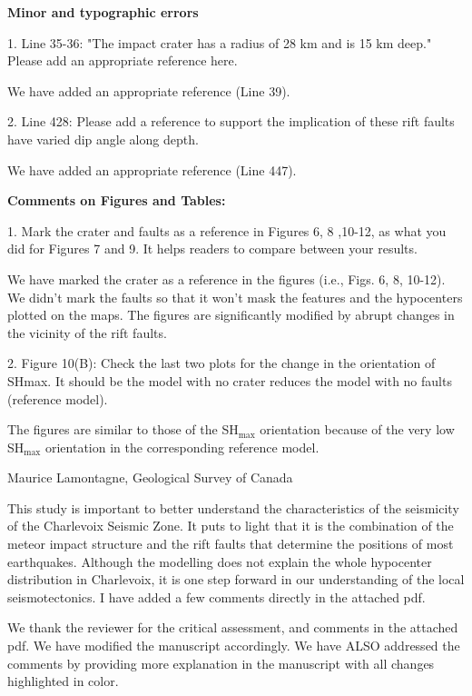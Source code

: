 \documentclass[12pt]{article}
\begin{document}
\textbf{Minor and typographic errors} 

\begin{response}{1. Line 35-36: "The impact crater has a radius of 28 km and is 15 km deep." Please add an appropriate reference here.}

  We have added an appropriate reference (Line 39).
\end{response}

\begin{response}{2. Line 428: Please add a reference to support the implication of these rift faults have varied dip angle along depth.}

  We have added an appropriate reference (Line 447).
\end{response}

\textbf{Comments on Figures and Tables:}

\begin{response}{1. Mark the crater and faults as a reference in Figures 6, 8 ,10-12, as what you did for Figures 7 and 9. It helps readers to compare between your results.}

  We have marked the crater as a reference in the figures (i.e., Figs. 6, 8, 10-12). We didn't mark the faults so that it won't mask the features and the hypocenters plotted on the maps. The figures are significantly modified by abrupt changes in the vicinity of the rift faults.
\end{response}

\begin{response}{2. Figure 10(B): Check the last two plots for the change in the orientation of SHmax. It should be the model with no crater reduces the model with no faults (reference model).}

  The figures are similar to those of the SH$_{\max}$ orientation because of the very low SH$_{\max}$ orientation in the corresponding reference model.
\end{response}




\begin{response}{Maurice Lamontagne, Geological Survey of Canada

This study is important to better understand the characteristics of the seismicity of the Charlevoix Seismic Zone. It puts to light that it is the combination of the meteor impact structure and the rift faults that determine the positions of most earthquakes. Although the modelling does not explain the whole hypocenter distribution in Charlevoix, it is one step forward in our understanding of the local seismotectonics. I have added a few comments directly in the attached pdf.}
    We thank the reviewer for the critical assessment, and comments in the attached pdf. We have modified the manuscript accordingly. We have ALSO addressed the comments by providing more explanation in the manuscript with all changes highlighted in color.
\end{response}
\end{document}
